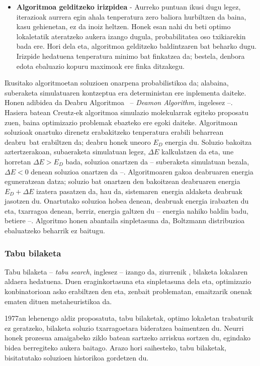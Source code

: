 \documentclass[eu]{ifirak}\usepackage[]{graphicx}\usepackage[]{color}
\newcommand{\zkk}{\guillemotleft}
\newcommand{\skk}{\guillemotright}
\begin{document}
\begin{itemize}
\item \textbf{Algoritmoa gelditzeko irizpidea} - Aurreko puntuan ikusi dugu legez, iterazioak aurrera egin ahala tenperatura zero baliora hurbiltzen da baina, kasu gehienetan, ez da inoiz heltzen. Honek esan nahi du beti optimo lokaletatik ateratzeko aukera izango dugula, probabilitatea oso txikiarekin bada ere. Hori dela eta, algoritmoa gelditzeko baldintzaren bat beharko dugu. Irizpide hedatuena tenperatura minimo bat finkatzea da; bestela, denbora edota ebaluazio kopuru maximoak ere finka ditzakegu.
\end{itemize}

Ikusitako algoritmoetan soluzioen onarpena probabilistikoa da; alabaina, suberaketa simulatuaren kontzeptua era deterministan ere inplementa daiteke. Honen adibidea da Deabru Algoritmoa~\cite{pepper2000} -- \textit{Deamon Algorithm}, ingelesez --. Hasiera batean Creutz-ek algoritmoa simulazio molekularrak egiteko proposatu zuen, baina optimizazio problemak ebazteko ere egoki daiteke. Algoritmoan soluzioak onartuko direnetz erabakitzeko tenperatura erabili beharrean \zkk deabru\skk\ bat erabiltzen da; deabru honek uneoro $E_D$ energia du. Soluzio bakoitza aztertzerakoan, subaeraketa simulatuan legez, $\Delta E$ kalkulatzen da eta, une horretan $\Delta E>E_D$ bada, soluzioa onartzen da -- suberaketa simulatuan bezala, $\Delta E<0$ denean soluzioa onartzen da --. Algoritmoaren gakoa deabruaren energia eguneratzean datza; soluzio bat onartzen den bakoitzean deabruaren energia $E_D + \Delta E$ izatera pasatzen da, hau da, \zkk sistemaren\skk\ energia aldaketa deabruak jasotzen du. Onartutako soluzioa hobea denean, deabruak energia irabazten du eta, txarragoa denean, berriz, energia galtzen du -- energia nahiko baldin badu, betiere --. Algoritmo honen abantaila sinpletasuna da, Boltzmann distribuzioa ebaluatzeko beharrik ez baitugu.

\subsubsection{Tabu bilaketa}

Tabu bilaketa -- \textit{tabu search}, inglesez -- izango da, ziurrenik , bilaketa lokalaren aldaera hedatuena. Duen eraginkortasuna eta sinpletasuna dela eta, optimizazio konbinatorioan asko erabiltzen den eta, zenbait problematan, emaitzarik onenak ematen dituen metaheuristikoa da.

1977an lehenengo aldiz proposatuta, tabu bilaketak, optimo lokaletan trabaturik ez geratzeko, bilaketa soluzio txarragoetara bideratzea baimentzen du. Neurri honek prozesua amaigabeko ziklo batean sartzeko arriskua sortzen du, egindako bidea berregiteko aukera baitago. Arazo hori saihesteko, tabu bilaketak, bisitatutako soluzioen historikoa gordetzen du.
\end{document}
